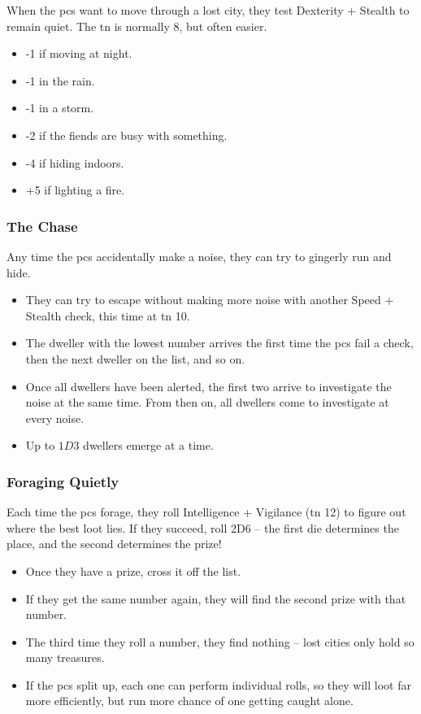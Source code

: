 \begin{multicols}{2}
When the \glspl{pc} want to move through a lost city, they test Dexterity + Stealth to remain quiet.
The \gls{tn} is normally 8, but often easier.

\begin{itemize}
  \item
  -1 if moving at night.
  \item
  -1 in the rain.
  \item
  -1 in a storm.
  \item
  -2 if the fiends are busy with something.
  \item
  -4 if hiding indoors.
  \item
  +5 if lighting a fire.
\end{itemize}

\subsubsection{The Chase}
\label{lostChase}

Any time the \glspl{pc} accidentally make a noise, they can try to gingerly run and hide.

\begin{itemize}
  \item
  They can try to escape without making more noise with another Speed + Stealth check, this time at \gls{tn} 10.
  \item
  The dweller with the lowest number arrives the first time the \glspl{pc} fail a check, then the next dweller on the list, and so on.
  \item
  Once all dwellers have been alerted, the first two arrive to investigate the noise at the same time.
  From then on, all dwellers come to investigate at every noise.
  \item
  Up to $1D3$ dwellers emerge at a time.
\end{itemize}

\subsubsection{Foraging Quietly}
\label{lostForaging}

Each time the \glspl{pc} forage, they roll Intelligence + Vigilance (\gls{tn} 12) to figure out where the best loot lies.
If they succeed, roll 2D6 -- the first die determines the place, and the second determines the prize!

\begin{itemize}
  \item
  Once they have a prize, cross it off the list.
  \item
  If they get the same number again, they will find the second prize with that number.
  \item
  The third time they roll a number, they find nothing -- lost cities only hold so many treasures.
  \item
  If the \glspl{pc} split up, each one can perform individual rolls, so they will loot far more efficiently, but run more chance of one getting caught alone.

\end{itemize}

\end{multicols}

